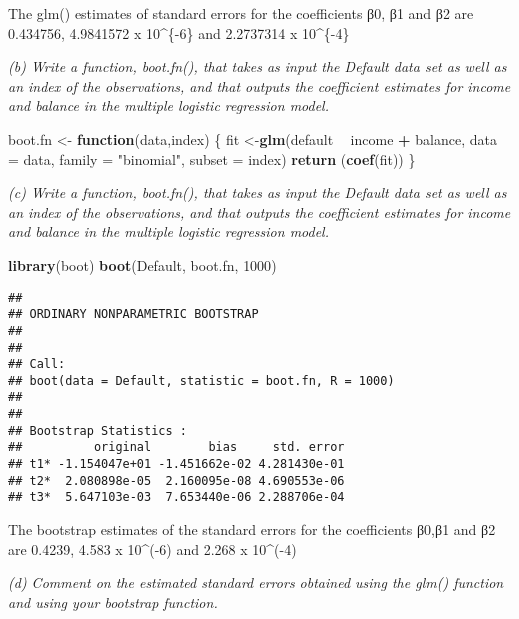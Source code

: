 \documentclass[]{article}
\newenvironment{Shaded}{\begin{snugshade}}{\end{snugshade}}
\newcommand{\KeywordTok}[1]{\textcolor[rgb]{0.13,0.29,0.53}{\textbf{#1}}}
\newcommand{\DataTypeTok}[1]{\textcolor[rgb]{0.13,0.29,0.53}{#1}}
\newcommand{\DecValTok}[1]{\textcolor[rgb]{0.00,0.00,0.81}{#1}}
\newcommand{\StringTok}[1]{\textcolor[rgb]{0.31,0.60,0.02}{#1}}
\newcommand{\ControlFlowTok}[1]{\textcolor[rgb]{0.13,0.29,0.53}{\textbf{#1}}}
\newcommand{\OperatorTok}[1]{\textcolor[rgb]{0.81,0.36,0.00}{\textbf{#1}}}
\newcommand{\NormalTok}[1]{#1}
\begin{document}
The glm() estimates of standard errors for the coefficients β0, β1 and
β2 are 0.434756, 4.9841572 x 10\^{}\{-6\} and 2.2737314 x 10\^{}\{-4\}

\emph{(b) Write a function, boot.fn(), that takes as input the Default
data set as well as an index of the observations, and that outputs the
coefficient estimates for income and balance in the multiple logistic
regression model.}

\begin{Shaded}
\begin{Highlighting}[]
\NormalTok{boot.fn <-}\StringTok{ }\ControlFlowTok{function}\NormalTok{(data,index)}
\NormalTok{\{}
\NormalTok{  fit <-}\KeywordTok{glm}\NormalTok{(default }\OperatorTok{~}\StringTok{ }\NormalTok{income }\OperatorTok{+}\StringTok{ }\NormalTok{balance, }\DataTypeTok{data =}\NormalTok{ data, }\DataTypeTok{family =} \StringTok{"binomial"}\NormalTok{, }\DataTypeTok{subset =}\NormalTok{ index)}
  \KeywordTok{return}\NormalTok{ (}\KeywordTok{coef}\NormalTok{(fit))}
\NormalTok{\}}
\end{Highlighting}
\end{Shaded}

\emph{(c) Write a function, boot.fn(), that takes as input the Default
data set as well as an index of the observations, and that outputs the
coefficient estimates for income and balance in the multiple logistic
regression model.}

\begin{Shaded}
\begin{Highlighting}[]
\KeywordTok{library}\NormalTok{(boot)}
\KeywordTok{boot}\NormalTok{(Default, boot.fn, }\DecValTok{1000}\NormalTok{)}
\end{Highlighting}
\end{Shaded}

\begin{verbatim}
## 
## ORDINARY NONPARAMETRIC BOOTSTRAP
## 
## 
## Call:
## boot(data = Default, statistic = boot.fn, R = 1000)
## 
## 
## Bootstrap Statistics :
##          original        bias     std. error
## t1* -1.154047e+01 -1.451662e-02 4.281430e-01
## t2*  2.080898e-05  2.160095e-08 4.690553e-06
## t3*  5.647103e-03  7.653440e-06 2.288706e-04
\end{verbatim}

The bootstrap estimates of the standard errors for the coefficients
β0,β1 and β2 are 0.4239, 4.583 x 10\^{}(-6) and 2.268 x 10\^{}(-4)

\emph{(d) Comment on the estimated standard errors obtained using the
glm() function and using your bootstrap function. }
\end{document}

